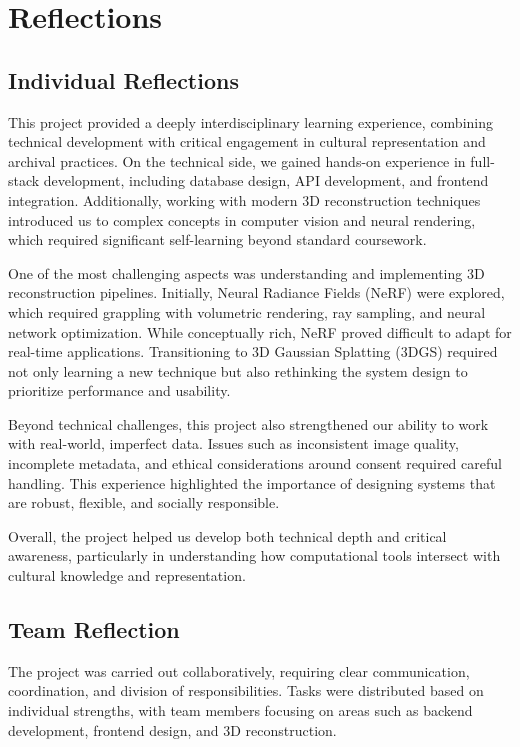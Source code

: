 \section{Reflections}

\subsection{Individual Reflections}

This project provided a deeply interdisciplinary learning experience, combining technical development with critical engagement in cultural representation and archival practices. On the technical side, we gained hands-on experience in full-stack development, including database design, API development, and frontend integration. Additionally, working with modern 3D reconstruction techniques introduced us to complex concepts in computer vision and neural rendering, which required significant self-learning beyond standard coursework.

One of the most challenging aspects was understanding and implementing 3D reconstruction pipelines. Initially, Neural Radiance Fields (NeRF) were explored, which required grappling with volumetric rendering, ray sampling, and neural network optimization. While conceptually rich, NeRF proved difficult to adapt for real-time applications. Transitioning to 3D Gaussian Splatting (3DGS) required not only learning a new technique but also rethinking the system design to prioritize performance and usability.

Beyond technical challenges, this project also strengthened our ability to work with real-world, imperfect data. Issues such as inconsistent image quality, incomplete metadata, and ethical considerations around consent required careful handling. This experience highlighted the importance of designing systems that are robust, flexible, and socially responsible.

Overall, the project helped us develop both technical depth and critical awareness, particularly in understanding how computational tools intersect with cultural knowledge and representation.

\subsection{Team Reflection}

The project was carried out collaboratively, requiring clear communication, coordination, and division of responsibilities. Tasks were distributed based on individual strengths, with team members focusing on areas such as backend development, frontend design, and 3D reconstruction.

